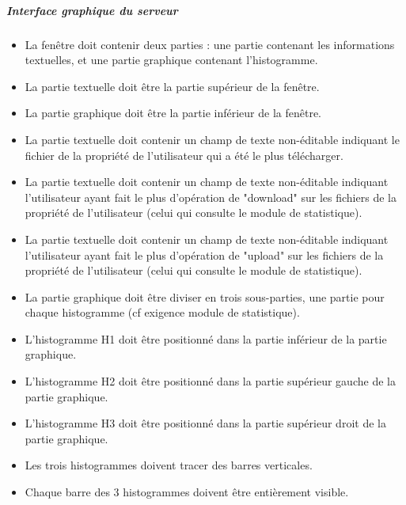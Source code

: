 \documentclass[10pt,a4paper]{report}
\begin{document}
	
	\subparagraph{Interface graphique du serveur}
		\begin{itemize}[label = $\triangleright$]
			\item La fenêtre doit contenir deux parties : une partie contenant les informations textuelles, et une partie graphique contenant l'histogramme.

			\item La partie textuelle doit être la partie supérieur de la fenêtre.

			\item La partie graphique doit être la partie inférieur de la fenêtre.

			\item La partie textuelle doit contenir un champ de texte non-éditable indiquant le fichier de la propriété de l'utilisateur qui a été le plus télécharger.

			\item La partie textuelle doit contenir un champ de texte non-éditable indiquant l'utilisateur ayant fait le plus d'opération de "download" sur les fichiers de la propriété de l'utilisateur (celui qui consulte le module de statistique).

			\item La partie textuelle doit contenir un champ de texte non-éditable indiquant l'utilisateur ayant fait le plus d'opération de "upload" sur les fichiers de la propriété de l'utilisateur (celui qui consulte le module de statistique).

			\item La partie graphique doit être diviser en trois sous-parties, une partie pour chaque histogramme (cf exigence module de statistique).

			\item L'histogramme H1 doit être positionné dans la partie inférieur de la partie graphique.

			\item L'histogramme H2 doit être positionné dans la partie supérieur gauche de la partie graphique.

			\item L'histogramme H3 doit être positionné dans la partie supérieur droit de la partie graphique.

			\item Les trois histogrammes doivent tracer des barres verticales.

			\item Chaque barre des 3 histogrammes doivent être entièrement visible.


\end{itemize}
\end{document}
